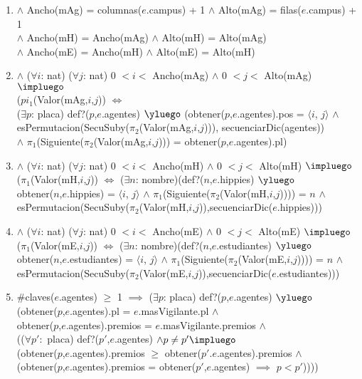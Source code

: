 \begin{Representacion}
{\begin{enumerate}
		\item $\land$ Ancho(mAg) = columnas($e$.campus) + 1 $\land$ Alto(mAg) = filas($e$.campus) + 1 \\
		$\land$ Ancho(mH) = Ancho(mAg) $\land$ Alto(mH) = Alto(mAg)\\
		$\land$ Ancho(mE) = Ancho(mH) $\land$ Alto(mE) = Alto(mH)
		\item $\land$ ($\forall i$: nat) ($\forall j$: nat) 0 $< i <$ Ancho(mAg) $\land$ 0 $< j <$ Alto(mAg) $\impluego$ \\
		($pi_1$(Valor(mAg,$i$,$j$)) $\iff$ \\
		($\exists p$: placa) def?($p$,$e$.agentes) $\yluego$ (obtener($p$,$e$.agentes).pos = $\langle i$, $j \rangle$ $\land$ \\ 
		esPermutacion(SecuSuby($\pi_2$(Valor(mAg,$i$,$j$))), secuenciarDic(agentes)) \\
		$\land$ $\pi_1$(Siguiente($\pi_2$(Valor(mAg,$i$,$j$))) = obtener($p$,$e$.agentes).pl)
		\item $\land$ ($\forall i$: nat) ($\forall j$: nat) 0 $< i <$ Ancho(mH) $\land$ 0 $< j <$ Alto(mH) $\impluego$ \\
		($\pi_1$(Valor(mH,$i$,$j$)) $\iff$ ($\exists n$: nombre)(def?($n$,$e$.hippies) $\yluego$ \\
		obtener($n$,$e$.hippies) = $\langle i$, $j \rangle$ $\land$ $\pi_1$(Siguiente($\pi_2$(Valor(mH,$i$,$j$)))) = $n$ $\land$ \\
		esPermutacion(SecuSuby($\pi_2$(Valor(mH,$i$,$j$)),secuenciarDic($e$.hippies)))
		\item $\land$ ($\forall i$: nat) ($\forall j$: nat) 0 $< i <$ Ancho(mE) $\land$ 0 $< j <$ Alto(mE) $\impluego$ \\
		($\pi_1$(Valor(mE,$i$,$j$)) $\iff$ ($\exists n$: nombre)(def?($n$,$e$.estudiantes) $\yluego$ \\
		obtener($n$,$e$.estudiantes) = $\langle i$, $j \rangle$ $\land$ $\pi_1$(Siguiente($\pi_2$(Valor(mE,$i$,$j$)))) = $n$ $\land$ \\
		esPermutacion(SecuSuby($\pi_2$(Valor(mE,$i$,$j$)),secuenciarDic($e$.estudiantes)))
		\item $\#$claves($e$.agentes) $\geq$ 1 $\implies$ ($\exists p$: placa) def?($p$,$e$.agentes) $\yluego$ \\
		(obtener($p$,$e$.agentes).pl = $e$.masVigilante.pl $\land$ \\
		obtener($p$,$e$.agentes).premios = $e$.masVigilante.premios $\land$ \\
		(($\forall p':$ placa) def?($p'$,$e$.agentes) $\land p \neq p' \impluego$\\
		(obtener($p$,$e$.agentes).premios $\geq$ obtener($p'$.$e$.agentes).premios $\land$ \\
		(obtener($p$,$e$.agentes).premios = obtener($p'$,$e$.agentes) $\implies$ $p < p'$))))


\end{enumerate}}
\end{Representacion}

